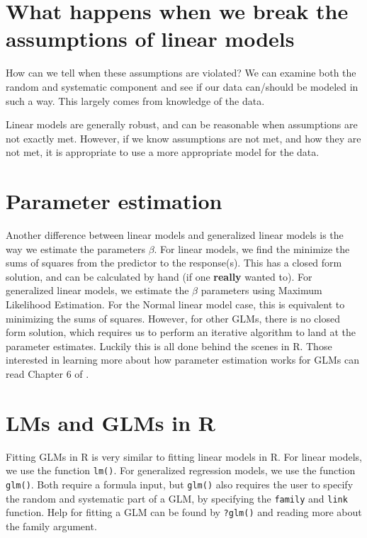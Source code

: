 \documentclass[
]{book}
\begin{document}
\hypertarget{what-happens-when-we-break-the-assumptions-of-linear-models}{%
\section{What happens when we break the assumptions of linear models}\label{what-happens-when-we-break-the-assumptions-of-linear-models}}

How can we tell when these assumptions are violated? We can examine both the random and systematic component and see if our data can/should be modeled in such a way. This largely comes from knowledge of the data.

Linear models are generally robust, and can be reasonable when assumptions are not exactly met. However, if we know assumptions are not met, and how they are not met, it is appropriate to use a more appropriate model for the data.

\hypertarget{parameter-estimation}{%
\section{Parameter estimation}\label{parameter-estimation}}

Another difference between linear models and generalized linear models is the way we estimate the parameters \(\beta\). For linear models, we find the minimize the sums of squares from the predictor to the response(s). This has a closed form solution, and can be calculated by hand (if one \textbf{really} wanted to). For generalized linear models, we estimate the \(\beta\) parameters using Maximum Likelihood Estimation. For the Normal linear model case, this is equivalent to minimizing the sums of squares. However, for other GLMs, there is no closed form solution, which requires us to perform an iterative algorithm to land at the parameter estimates. Luckily this is all done behind the scenes in R. Those interested in learning more about how parameter estimation works for GLMs can read Chapter 6 of \citep{dunn2018generalized}.

\hypertarget{lms-and-glms-in-r}{%
\section{LMs and GLMs in R}\label{lms-and-glms-in-r}}

Fitting GLMs in R is very similar to fitting linear models in R. For linear models, we use the function \texttt{lm()}. For generalized regression models, we use the function \texttt{glm()}. Both require a formula input, but \texttt{glm()} also requires the user to specify the random and systematic part of a GLM, by specifying the \texttt{family} and \texttt{link} function. Help for fitting a GLM can be found by \texttt{?glm()} and reading more about the family argument.
\end{document}
